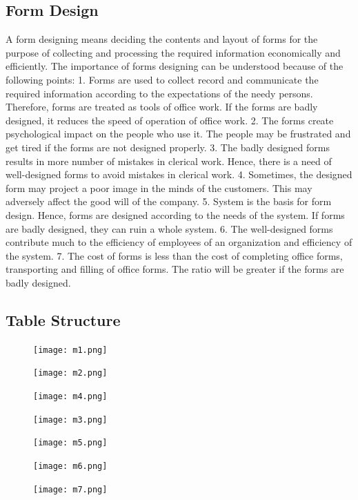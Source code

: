 \documentclass[a4paper,12pt]{article}
\begin{document}
\subsection{Form Design}
\hspace{5mm}
 A form designing means deciding the contents and layout of forms for the purpose of collecting and processing the required information economically and efficiently. The importance of forms designing can be understood because of the following points:
1. Forms are used to collect record and communicate the required information according to the expectations of the needy persons. Therefore, forms are treated as tools of office work. If the forms are badly designed, it reduces the speed of operation of office work.
2. The forms create psychological impact on the people who use it. The people may be frustrated and get tired if the forms are not designed properly.
3. The badly designed forms results in more number of mistakes in clerical work. Hence, there is a need of well-designed forms to avoid mistakes in clerical work.
4. Sometimes, the designed form may project a poor image in the minds of the customers. This may adversely affect the good will of the company.
5. System is the basis for form design. Hence, forms are designed according to the needs of the system. If forms are badly designed, they can ruin a whole system.
6. The well-designed forms contribute much to the efficiency of employees of an organization and efficiency of the system.
7. The cost of forms is less than the cost of completing office forms, transporting and filling of office forms. The ratio will be greater if the forms are badly designed.  
\newpage
\subsection{Table Structure}
\hspace{5mm}
\begin{figure}[h!]
\texttt{[image: m1.png]}
\end{figure}
\begin{figure}[h!]
\texttt{[image: m2.png]}

\end{figure}
\newpage
\begin{figure}[h!]
\texttt{[image: m4.png]}

\end{figure}
\begin{figure}[h!]
\centering
\texttt{[image: m3.png]}

\end{figure}
\newpage
\begin{figure}[h!]
\centering
\texttt{[image: m5.png]}
\end{figure}
\begin{figure}[h!]
\texttt{[image: m6.png]}
\end{figure}
\newpage
\begin{figure}[h!]
\texttt{[image: m7.png]}
\end{figure}
\end{document}
